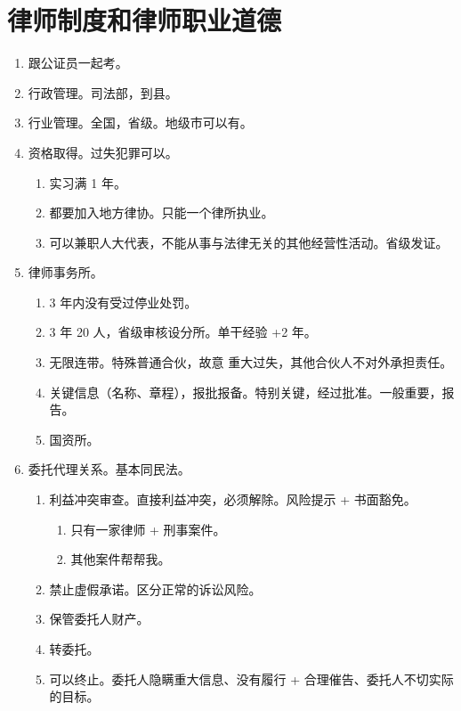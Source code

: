\section{律师制度和律师职业道德}
\begin{enumerate}
  \item 跟公证员一起考。
  \item 行政管理。司法部，到县。
  \item 行业管理。全国，省级。地级市可以有。
  \item 资格取得。过失犯罪可以。
        \begin{enumerate}
          \item 实习满 1 年。
          \item 都要加入地方律协。只能一个律所执业。
          \item 可以兼职人大代表，不能从事与法律无关的其他经营性活动。省级发证。
        \end{enumerate}
  \item 律师事务所。
        \begin{enumerate}
          \item 3 年内没有受过停业处罚。
          \item 3 年 20 人，省级审核设分所。单干经验 +2 年。
          \item 无限连带。特殊普通合伙，故意 \hz 重大过失，其他合伙人不对外承担责任。
          \item 关键信息（名称、章程），报批报备。特别关键，经过批准。一般重要，报告。
          \item 国资所。
        \end{enumerate}
  \item 委托代理关系。基本同民法。
        \begin{enumerate}
          \item 利益冲突审查。直接利益冲突，必须解除。风险提示 + 书面豁免。
                \begin{enumerate}
                  \item 只有一家律师 + 刑事案件。
                  \item 其他案件帮帮我。
                \end{enumerate}
          \item 禁止虚假承诺。区分正常的诉讼风险。
          \item 保管委托人财产。
          \item 转委托。
          \item 可以终止。委托人隐瞒重大信息、没有履行 + 合理催告、委托人不切实际的目标。
        \end{enumerate}

\end{enumerate}
